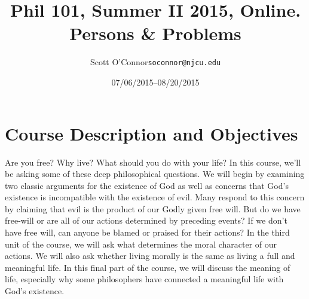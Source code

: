\documentclass[11pt,article,oneside]{memoir}
\makeatletter
\def\myauthor{Author}
\def\mytitle{Title}
\def\mycopyright{\myauthor}
\def\myemail{soconnor@njcu.edu}
\def\myauthor{Scott O'Connor}
\def\mytitle{{\normalsize Phil 101, Summer II 2015, Online. \newline} \HUGE Persons \& Problems}
\makeatother
\begin{document}
\setsansfont[Mapping=tex-text]{Georgia} 
\setmonofont[Mapping=tex-text,Scale=0.8]{Georgia} 

\def\ind{\hangindent=1 true cm\hangafter=1 \noindent}
\def\labelitemi{$\cdot$}

\pagestyle{kjh}

\title{\LARGE \mytitle}     
\author{\Large\myauthor \newline \footnotesize\texttt{\noindent\myemail}}
\date{07/06/2015--08/20/2015}

\published{\,}

\maketitle




%
%

\section{Course Description and Objectives}

Are you free? Why live? What should you do with your life? In this
course, we'll be asking some of these deep philosophical questions. We
will begin by examining two classic arguments for the existence of God
as well as concerns that God's existence is incompatible with the
existence of evil. Many respond to this concern by claiming that evil is
the product of our Godly given free will. But do we have free-will or
are all of our actions determined by preceding events? If we don't have
free will, can anyone be blamed or praised for their actions? In the
third unit of the course, we will ask what determines the moral
character of our actions. We will also ask whether living morally is the
same as living a full and meaningful life. In this final part of the
course, we will discuss the meaning of life, especially why some
philosophers have connected a meaningful life with God's existence.
\end{document}

